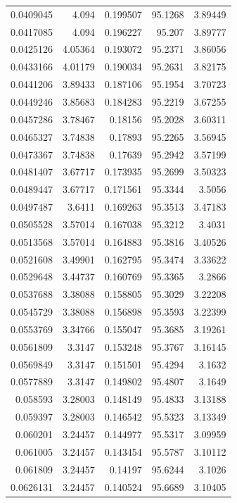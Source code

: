 \begin{tabular}{rrrrr}
0.0409045 &   4.094 &  0.199507 &  95.1268 & 3.89449 \\
0.0417085 &   4.094 &  0.196227 &   95.207 & 3.89777 \\
0.0425126 & 4.05364 &  0.193072 &  95.2371 & 3.86056 \\
0.0433166 & 4.01179 &  0.190034 &  95.2631 & 3.82175 \\
0.0441206 & 3.89433 &  0.187106 &  95.1954 & 3.70723 \\
0.0449246 & 3.85683 &  0.184283 &  95.2219 & 3.67255 \\
0.0457286 & 3.78467 &   0.18156 &  95.2028 & 3.60311 \\
0.0465327 & 3.74838 &   0.17893 &  95.2265 & 3.56945 \\
0.0473367 & 3.74838 &   0.17639 &  95.2942 & 3.57199 \\
0.0481407 & 3.67717 &  0.173935 &  95.2699 & 3.50323 \\
0.0489447 & 3.67717 &  0.171561 &  95.3344 &  3.5056 \\
0.0497487 &  3.6411 &  0.169263 &  95.3513 & 3.47183 \\
0.0505528 & 3.57014 &  0.167038 &  95.3212 &  3.4031 \\
0.0513568 & 3.57014 &  0.164883 &  95.3816 & 3.40526 \\
0.0521608 & 3.49901 &  0.162795 &  95.3474 & 3.33622 \\
0.0529648 & 3.44737 &  0.160769 &  95.3365 &  3.2866 \\
0.0537688 & 3.38088 &  0.158805 &  95.3029 & 3.22208 \\
0.0545729 & 3.38088 &  0.156898 &  95.3593 & 3.22399 \\
0.0553769 & 3.34766 &  0.155047 &  95.3685 & 3.19261 \\
0.0561809 &  3.3147 &  0.153248 &  95.3767 & 3.16145 \\
0.0569849 &  3.3147 &  0.151501 &  95.4294 &  3.1632 \\
0.0577889 &  3.3147 &  0.149802 &  95.4807 &  3.1649 \\
 0.058593 & 3.28003 &  0.148149 &  95.4833 & 3.13188 \\
 0.059397 & 3.28003 &  0.146542 &  95.5323 & 3.13349 \\
 0.060201 & 3.24457 &  0.144977 &  95.5317 & 3.09959 \\
 0.061005 & 3.24457 &  0.143454 &  95.5787 & 3.10112 \\
 0.061809 & 3.24457 &   0.14197 &  95.6244 &  3.1026 \\
0.0626131 & 3.24457 &  0.140524 &  95.6689 & 3.10405 \\

\end{tabular}
